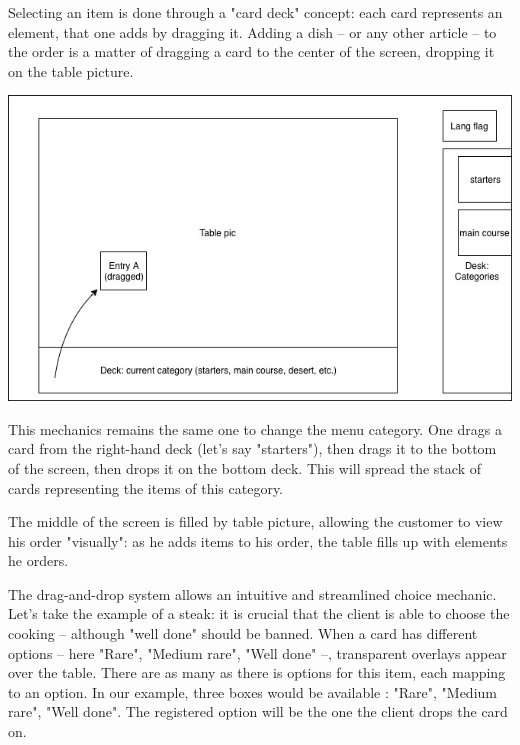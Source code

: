 \documentclass[a4paper,12pt]{article}
\begin{document}
Selecting an item is done through a "card deck" concept: each card represents an element, that one adds by dragging
it. Adding a dish -- or any other article -- to the order is a matter of dragging a card to the center of the screen,
dropping it on the table picture.

\begin{center}
	\includegraphics[width=\textwidth]{in_place_drag.jpg}
\end{center}

This mechanics remains the same one to change the menu category. One drags a card from the right-hand deck (let's
say "starters"), then drags it to the bottom of the screen, then drops it on the bottom deck. This will spread the
stack of cards representing the items of this category.

The middle of the screen is filled by table picture, allowing the customer to view his order "visually": as he adds
items to his order, the table fills up with elements he orders.

The drag-and-drop system allows an intuitive and streamlined choice mechanic. Let's take the example of a steak:
it is crucial that the client is able to choose the cooking -- although "well done" should be banned. When a card
has different options -- here "Rare", "Medium rare", "Well done" --, transparent overlays appear over the table.
There are as many as there is options for this item, each mapping to an option. In our example, three boxes would be
available : "Rare", "Medium rare", "Well done". The registered option will be the one the client drops the card on.
\end{document}
